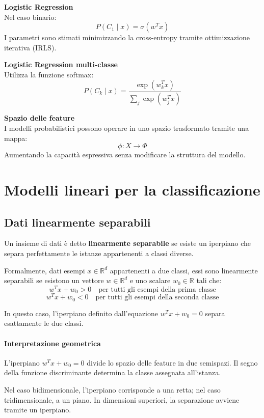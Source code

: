 \documentclass[a4paper,12pt]{report}
\begin{document}
\begin{tcolorbox}[
    colback=green!10,
    colframe=green!50!black,
    boxrule=0.4pt,
    left=6pt,
    right=6pt,
    top=6pt,
    bottom=6pt,
    breakable
]
\medskip
\textbf{Logistic Regression} \\
Nel caso binario:
\[
P(C_1 \mid x) = \sigma(w^T x)
\]
I parametri sono stimati minimizzando la cross-entropy tramite ottimizzazione iterativa (IRLS).

\medskip
\textbf{Logistic Regression multi-classe} \\
Utilizza la funzione softmax:
\[
P(C_k \mid x) =
\frac{\exp(w_k^T x)}{\sum_j \exp(w_j^T x)}
\]

\medskip
\textbf{Spazio delle feature} \\
I modelli probabilistici possono operare in uno spazio trasformato tramite una mappa:
\[
\phi : X \rightarrow \Phi
\]
Aumentando la capacità espressiva senza modificare la struttura del modello.

\end{tcolorbox}

\chapter{Modelli lineari per la classificazione}
\section{Dati linearmente separabili}

Un insieme di dati è detto \textbf{linearmente separabile} se esiste un iperpiano che separa perfettamente le istanze appartenenti a classi diverse.

Formalmente, dati esempi \( x \in \mathbb{R}^d \) appartenenti a due classi, essi sono linearmente separabili se esistono un vettore \( w \in \mathbb{R}^d \) e uno scalare \( w_0 \in \mathbb{R} \) tali che:
\[
w^T x + w_0 > 0 \quad \text{per tutti gli esempi della prima classe}
\]
\[
w^T x + w_0 < 0 \quad \text{per tutti gli esempi della seconda classe}
\]

In questo caso, l’iperpiano definito dall’equazione \( w^T x + w_0 = 0 \) separa esattamente le due classi.

\subsubsection{Interpretazione geometrica}

L’iperpiano \( w^T x + w_0 = 0 \) divide lo spazio delle feature in due semispazi.
Il segno della funzione discriminante determina la classe assegnata all’istanza.

Nel caso bidimensionale, l’iperpiano corrisponde a una retta; nel caso tridimensionale, a un piano.
In dimensioni superiori, la separazione avviene tramite un iperpiano.
\end{document}
